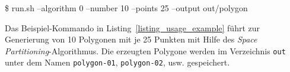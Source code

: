 \begin{code}[caption={Beispiel-Ausführung},label=listing_usage_example]
\$ run.sh --algorithm 0 --number 10 --points 25 --output out/polygon
\end{code}

    Das Beispiel-Kommando in Listing~\ref{listing_usage_example} führt zur
    Generierung von 10 Polygonen mit je 25 Punkten mit Hilfe des \emph{Space
    Partitioning}-Algorithmus. Die erzeugten Polygone werden im Verzeichnis
    \texttt{out} unter dem Namen \texttt{polygon-01}, \texttt{polygon-02}, usw.
    gespeichert.
